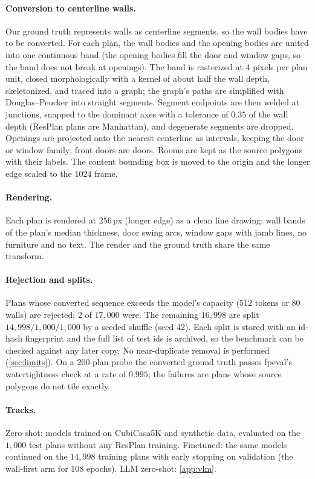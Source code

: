 \documentclass{article}
\begin{document}
\paragraph{Conversion to centerline walls.} Our ground truth represents walls
as centerline segments, so the wall bodies have to be converted. For each
plan, the wall bodies and the opening bodies are united into one continuous
band (the opening bodies fill the door and window gaps, so the band does not
break at openings). The band is rasterized at $4$ pixels per plan unit, closed
morphologically with a kernel of about half the wall depth, skeletonized, and
traced into a graph; the graph's paths are simplified with Douglas--Peucker
into straight segments. Segment endpoints are then welded at junctions,
snapped to the dominant axes with a tolerance of $0.35$ of the wall depth
(ResPlan plans are Manhattan), and degenerate segments are dropped. Openings
are projected onto the nearest centerline as intervals, keeping the door or
window family; front doors are doors. Rooms are kept as the source polygons
with their labels. The content bounding box is moved to the origin and the
longer edge scaled to the $1024$ frame.

\paragraph{Rendering.} Each plan is rendered at $256$\,px (longer edge) as a
clean line drawing: wall bands of the plan's median thickness, door swing
arcs, window gaps with jamb lines, no furniture and no text. The render and
the ground truth share the same transform.

\paragraph{Rejection and splits.} Plans whose converted sequence exceeds the
model's capacity ($512$ tokens or $80$ walls) are rejected; $2$ of $17{,}000$
were. The remaining $16{,}998$ are split $14{,}998/1{,}000/1{,}000$ by a seeded
shuffle (seed 42). Each split is stored with an id-hash fingerprint and the
full list of test ids is archived, so the benchmark can be checked against any
later copy. No near-duplicate removal is performed (\cref{sec:limits}). On a
$200$-plan probe the converted ground truth passes fpeval's watertightness
check at a rate of $0.995$; the failures are plans whose source polygons do
not tile exactly.

\paragraph{Tracks.} Zero-shot: models trained on CubiCasa5K and synthetic
data, evaluated on the $1{,}000$ test plans without any ResPlan training.
Finetuned: the same models continued on the $14{,}998$ training plans with
early stopping on validation (the wall-first arm for $108$ epochs).
LLM zero-shot: \cref{app:vlm}.
\end{document}
